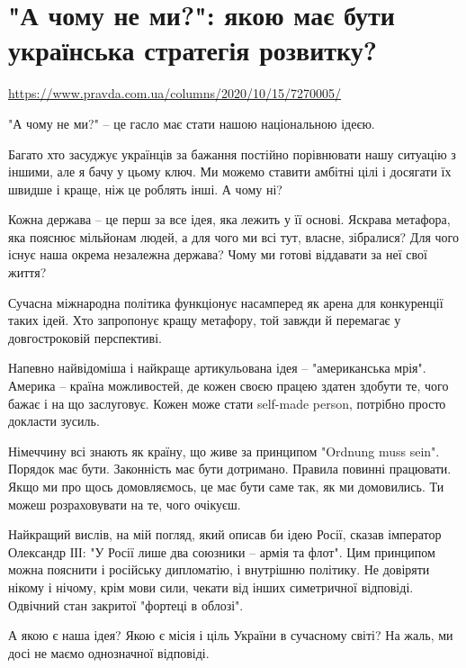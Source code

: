  
 

\section{"А чому не ми?": якою має бути українська стратегія розвитку? }
\url{https://www.pravda.com.ua/columns/2020/10/15/7270005/}

"А чому не ми?" – це гасло має стати нашою національною ідеєю. 

Багато хто засуджує українців за бажання постійно порівнювати нашу ситуацію з
іншими, але я бачу у цьому ключ. Ми можемо ставити амбітні цілі і досягати їх
швидше і краще, ніж це роблять інші. А чому ні? 

Кожна держава – це перш за все ідея, яка лежить у її основі. Яскрава метафора,
яка пояснює мільйонам людей, а для чого ми всі тут, власне, зібралися? Для чого
існує наша окрема незалежна держава? Чому ми готові віддавати за неї свої
життя? 

Сучасна міжнародна політика функціонує насамперед як арена для конкуренції
таких ідей. Хто запропонує кращу метафору, той завжди й перемагає у
довгостроковій перспективі.

Напевно найвідоміша і найкраще артикульована ідея – "американська мрія".
Америка – країна можливостей, де кожен своєю працею здатен здобути те, чого
бажає і на що заслуговує. Кожен може стати self-made person, потрібно просто
докласти зусиль. 

Німеччину всі знають як країну, що живе за принципом "Ordnung muss sein". Порядок має бути. Законність має бути дотримано. Правила повинні працювати. Якщо ми про щось домовляємось, це має бути саме так, як ми домовились. Ти можеш розраховувати на те, чого очікуєш. 

Найкращий вислів, на мій погляд, який описав би ідею Росії, сказав імператор
Олександр ІІІ: "У Росії лише два союзники – армія та флот". Цим принципом можна
пояснити і російську дипломатію, і внутрішню політику. Не довіряти нікому і
нічому, крім мови сили, чекати від інших симетричної відповіді. Одвічний стан
закритої "фортеці в облозі". 

А якою є наша ідея? Якою є місія і ціль України в сучасному світі? На жаль, ми
досі не маємо однозначної відповіді.

